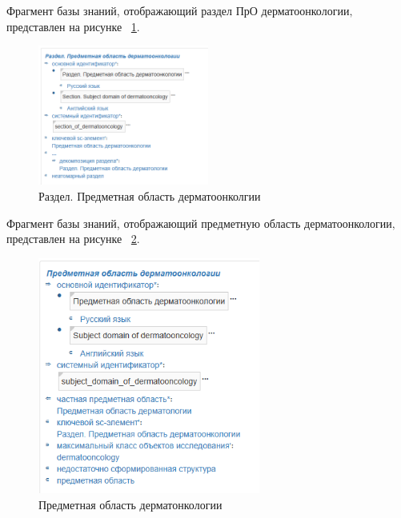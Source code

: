 Фрагмент базы знаний, отображающий  раздел ПрО дерматоонкологии$,$ представлен на рисунке
~\ref{fig:sections/section_of_dermatooncology}.
\begin{figure}[H]
	\centering
	\includegraphics[width=0.5\textwidth]{sections/section_of_dermatooncology.png}
	\caption{Раздел. Предметная область дерматоонколгии}
	\label{fig:sections/section_of_dermatooncology}
\end{figure}
Фрагмент базы знаний, отображающий предметную область дерматоонкологии$,$ представлен на рисунке
~\ref{fig:sections/subject_domain_of_dermatooncology}.
\begin{figure}[H]
	\centering
	\includegraphics[width=0.65\textwidth]{sections/subject_domain_of_dermatooncology.png}
	\caption{Предметная область дерматонкологии}
	\label{fig:sections/subject_domain_of_dermatooncology}
\end{figure}

